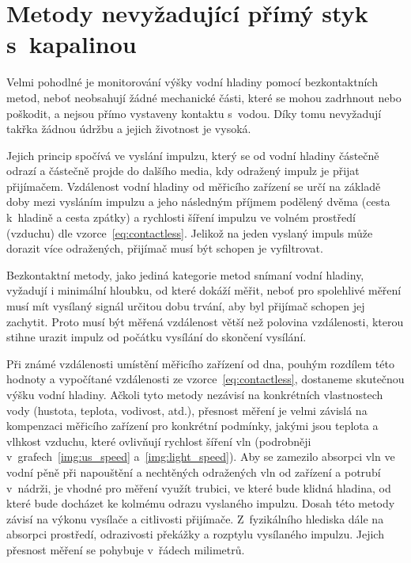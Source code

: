     \section{Metody nevyžadující přímý styk s~kapalinou}
        \label{sec:contactless}
        Velmi pohodlné je monitorování výšky vodní hladiny pomocí bezkontaktních metod, neboť neobsahují žádné mechanické části, které se mohou zadrhnout nebo poškodit, a nejsou přímo vystaveny kontaktu s~vodou. Díky tomu nevyžadují takřka žádnou údržbu a jejich životnost je vysoká. 

        Jejich princip spočívá ve vyslání impulzu, který se od vodní hladiny částečně odrazí a částečně projde do dalšího media, kdy odražený impulz je přijat přijímačem. Vzdálenost vodní hladiny od měřicího zařízení se určí na základě doby mezi vysláním impulzu a jeho následným příjmem podělený dvěma (cesta k~hladině a cesta zpátky) a rychlosti šíření impulzu ve volném prostředí (vzduchu) dle vzorce~\ref{eq:contactless}. Jelikož na jeden vyslaný impuls může dorazit více odražených, přijímač musí být schopen je vyfiltrovat. 

        Bezkontaktní metody, jako jediná kategorie metod snímaní vodní hladiny, vyžadují i minimální hloubku, od které dokáží měřit, neboť pro spolehlivé měření musí mít vysílaný signál určitou dobu trvání, aby byl přijímač schopen jej zachytit. Proto musí být měřená vzdálenost větší než polovina vzdálenosti, kterou stihne urazit impulz od počátku vysílání do skončení vysílání. 

        Při známé vzdálenosti umístění měřicího zařízení od dna, pouhým rozdílem této hodnoty a vypočítané vzdálenosti ze vzorce~\ref{eq:contactless}, dostaneme skutečnou výšku vodní hladiny. Ačkoli tyto metody nezávisí na konkrétních vlastnostech vody (hustota, teplota, vodivost, atd.), přesnost měření je velmi závislá na kompenzaci měřicího zařízení pro konkrétní podmínky, jakými jsou teplota a vlhkost vzduchu, které ovlivňují rychlost šíření vln (podrobněji v~grafech~\ref{img:us_speed} a~\ref{img:light_speed}). Aby se zamezilo absorpci vln ve vodní pěně při napouštění a nechtěných odražených vln od zařízení a potrubí v~nádrži, je vhodné pro měření využít trubici, ve které bude klidná hladina, od které bude docházet ke kolmému odrazu vyslaného impulzu. Dosah této metody závisí na výkonu vysílače a citlivosti přijímače. Z~fyzikálního hlediska dále na absorpci prostředí, odrazivosti překážky a rozptylu vysílaného impulzu. Jejich přesnost měření se pohybuje v~řádech milimetrů.

